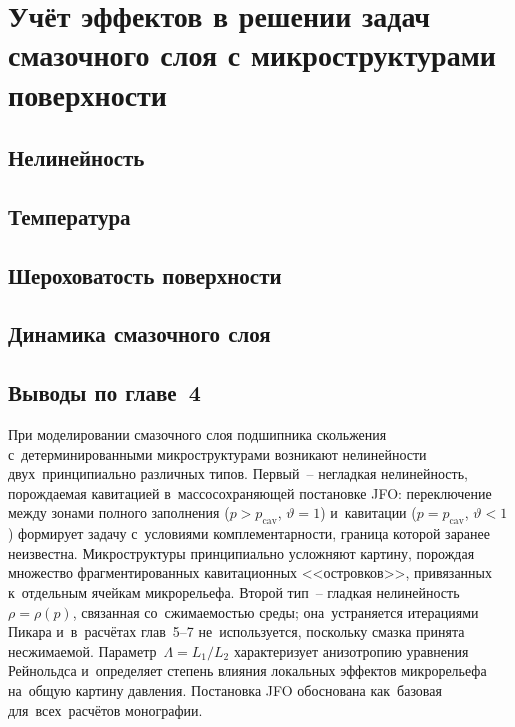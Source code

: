 \chapter{Учёт эффектов в решении задач смазочного слоя с микроструктурами поверхности}

\section{Нелинейность}


\FloatBarrier
\section{Температура}


\FloatBarrier
\section{Шероховатость поверхности}


\FloatBarrier
\section{Динамика смазочного слоя}


\FloatBarrier
\section*{Выводы по главе~4}

При моделировании смазочного слоя подшипника скольжения
с~детерминированными микроструктурами возникают нелинейности
двух~принципиально различных типов. Первый~-- негладкая
нелинейность, порождаемая кавитацией в~массосохраняющей
постановке JFO: переключение между зонами полного заполнения
($p > p_{\mathrm{cav}}$, $\vartheta = 1$) и~кавитации
($p = p_{\mathrm{cav}}$, $\vartheta < 1$) формирует задачу
с~условиями комплементарности, граница которой заранее
неизвестна. Микроструктуры принципиально усложняют картину,
порождая множество фрагментированных кавитационных
<<островков>>, привязанных к~отдельным ячейкам микрорельефа.
Второй тип~-- гладкая нелинейность $\rho = \rho(p)$,
связанная со~сжимаемостью среды; она~устраняется итерациями
Пикара и~в~расчётах глав~5--7 не~используется, поскольку
смазка принята несжимаемой. Параметр~$\Lambda = L_1/L_2$
характеризует анизотропию уравнения Рейнольдса и~определяет
степень влияния локальных эффектов микрорельефа на~общую
картину давления. Постановка JFO обоснована как~базовая
для~всех~расчётов монографии.

